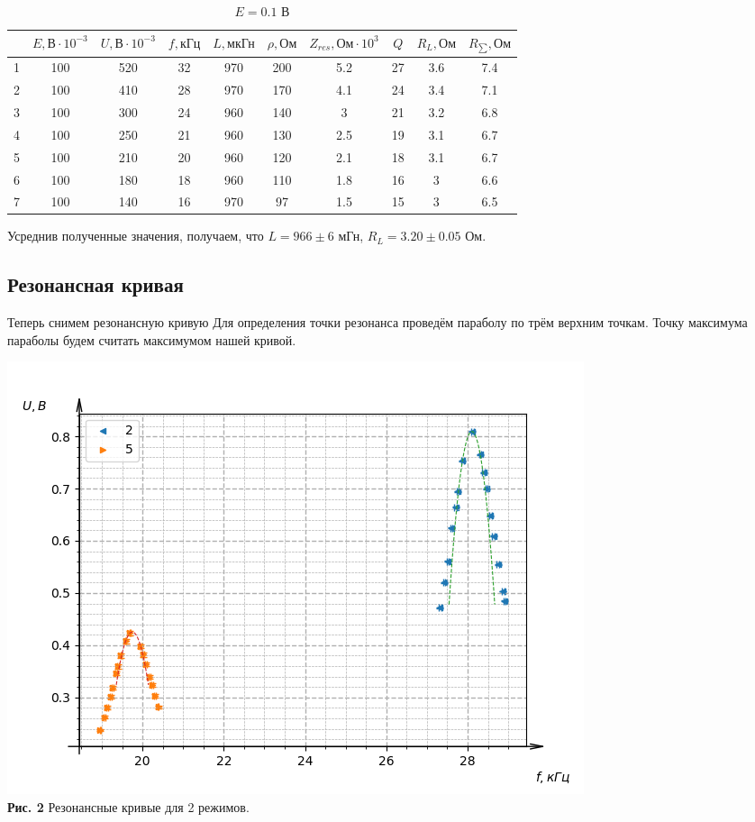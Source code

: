 \documentclass[a4paper, 12pt]{article}%
\begin{document}
\begin{table}[!ht]
\center
\caption{$E=0.1$ В}
\begin{tabular}{|c|c|c|c|c|c|c|c|c|c|}
\hline
\rowcolor[HTML]{C0C0C0}
 & $E, \text{В}\cdot 10^{-3} $ & $U, \text{В}\cdot 10^{-3} $ & $f, \text{кГц}$ & $L, \text{мкГн}$ & $\rho, \text{Ом}$ & $Z_{res}, \text{Ом}\cdot 10^{3} $ & $Q$ & $R_L, \text{Ом}$ & $R_{\sum}, \text{Ом}$ \\ \hline
\cellcolor[HTML]{C0C0C0} 1 & 100 & 520 & 32 & 970 & 200 & 5.2 & 27 & 3.6 & 7.4 \\ \hline
\rowcolor[HTML]{EFEFEF} 
\cellcolor[HTML]{C0C0C0} 2 & 100 & 410 & 28 & 970 & 170 & 4.1 & 24 & 3.4 & 7.1 \\ \hline
\cellcolor[HTML]{C0C0C0} 3 & 100 & 300 & 24 & 960 & 140 & 3 & 21 & 3.2 & 6.8 \\ \hline
\rowcolor[HTML]{EFEFEF} 
\cellcolor[HTML]{C0C0C0} 4 & 100 & 250 & 21 & 960 & 130 & 2.5 & 19 & 3.1 & 6.7 \\ \hline
\cellcolor[HTML]{C0C0C0} 5 & 100 & 210 & 20 & 960 & 120 & 2.1 & 18 & 3.1 & 6.7 \\ \hline
\rowcolor[HTML]{EFEFEF} 
\cellcolor[HTML]{C0C0C0} 6 & 100 & 180 & 18 & 960 & 110 & 1.8 & 16 & 3 & 6.6 \\ \hline
\cellcolor[HTML]{C0C0C0} 7 & 100 & 140 & 16 & 970 & 97 & 1.5 & 15 & 3 & 6.5 \\ \hline
\end{tabular}
\end{table}

Усреднив полученные значения, получаем, что $L=966 \pm 6$ мГн, $R_L=3.20 \pm 0.05$ Ом.
\subsection*{Резонансная кривая}
Теперь снимем резонансную кривую %
Для определения точки резонанса проведём параболу по трём верхним точкам. Точку максимума параболы будем считать максимумом нашей кривой. 

\begin{center}
\includegraphics[width=\textwidth]{Figure_1.png}\\
\textbf{Рис. 2} Резонансные кривые для 2 режимов.
\end{center}
\end{document}
